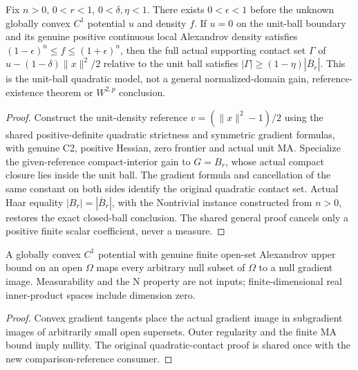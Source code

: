 \begin{lemma}
  \label{lem:convex-unit-ball-contact-gain}
  \leanok
  Fix $n>0$, $0<r<1$, $0<\delta,\eta<1$. There exists $0<\epsilon<1$
  before the unknown globally convex $C^1$ potential $u$ and density $f$.
  If $u=0$ on the unit-ball boundary and its genuine positive continuous
  local Alexandrov density satisfies $(1-\epsilon)^n\le f\le(1+\epsilon)^n$,
  then the full actual supporting contact set $\Gamma$ of
  $u-(1-\delta)\|x\|^2/2$ relative to the unit ball satisfies
  $|\Gamma|\ge(1-\eta)|\overline B_r|$.
  This is the unit-ball quadratic model, not a general normalized-domain gain,
  reference-existence theorem or $W^{2,p}$ conclusion.
\end{lemma}
\begin{proof}
  \leanok
  Construct the unit-density reference $v=(\|x\|^2-1)/2$ using the shared
  positive-definite quadratic strictness and symmetric gradient formulas, with
  genuine C2, positive Hessian, zero frontier and actual unit MA. Specialize the
  given-reference compact-interior gain to $G=B_r$, whose actual compact closure
  lies inside the unit ball. The gradient formula and cancellation of the same
  constant on both sides identify the original quadratic contact set.
  Actual Haar equality $|B_r|=|\overline B_r|$, with the Nontrivial instance
  constructed from $n>0$, restores the exact closed-ball conclusion. The shared
  general proof cancels only a positive finite scalar coefficient, never a measure.
\end{proof}


\begin{lemma}
  \label{lem:convex-gradient-null-image}
  \leanok
  A globally convex $C^1$ potential with genuine finite open-set Alexandrov
  upper bound on an open $\Omega$ maps every arbitrary null subset of $\Omega$
  to a null gradient image. Measurability and the N property are not inputs;
  finite-dimensional real inner-product spaces include dimension zero.
\end{lemma}
\begin{proof}
  \leanok
  Convex gradient tangents place the actual gradient image in subgradient images
  of arbitrarily small open supersets. Outer regularity and the finite MA bound
  imply nullity. The original quadratic-contact proof is shared once with the
  new comparison-reference consumer.
\end{proof}

